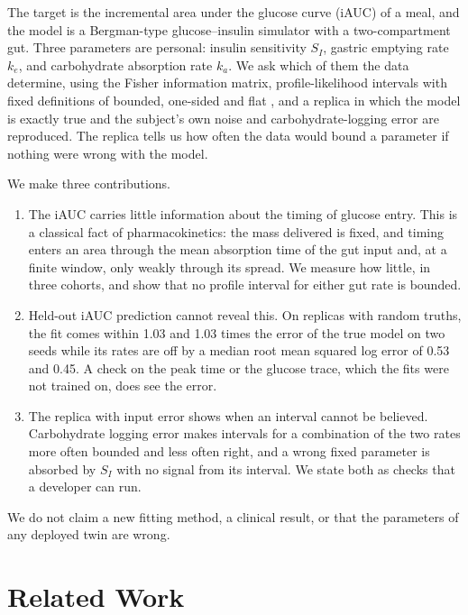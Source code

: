 \documentclass[letterpaper]{article} %
\newcommand{\resPvpRandomOneRatio}{1.03}
\newcommand{\resPvpRandomOneTiming}{0.45}
\newcommand{\resPvpRandomZeroRatio}{1.03}
\newcommand{\resPvpRandomZeroTiming}{0.53}
\begin{document}
The target is the incremental area under the glucose curve (iAUC) of a meal, and the model is a Bergman-type glucose--insulin simulator \citep{bergman1979,dallaman2007} with a two-compartment gut. Three parameters are personal: insulin sensitivity $S_I$, gastric emptying rate $k_e$, and carbohydrate absorption rate $k_a$. We ask which of them the data determine, using the Fisher information matrix, profile-likelihood intervals with fixed definitions of bounded, one-sided and flat \citep{raue2009structural}, and a replica in which the model is exactly true and the subject's own noise and carbohydrate-logging error are reproduced. The replica tells us how often the data would bound a parameter if nothing were wrong with the model.

We make three contributions.
\begin{enumerate}
\item The iAUC carries little information about the timing of glucose entry. This is a classical fact of pharmacokinetics: the mass delivered is fixed, and timing enters an area through the mean absorption time of the gut input \citep{yamaoka1978statistical,cutler1978theory} and, at a finite window, only weakly through its spread. We measure how little, in three cohorts, and show that no profile interval for either gut rate is bounded.
\item Held-out iAUC prediction cannot reveal this. On replicas with random truths, the fit comes within \resPvpRandomZeroRatio{} and \resPvpRandomOneRatio{} times the error of the true model on two seeds while its rates are off by a median root mean squared log error of \resPvpRandomZeroTiming{} and \resPvpRandomOneTiming{}. A check on the peak time or the glucose trace, which the fits were not trained on, does see the error.
\item The replica with input error shows when an interval cannot be believed. Carbohydrate logging error makes intervals for a combination of the two rates more often bounded and less often right, and a wrong fixed parameter is absorbed by $S_I$ with no signal from its interval. We state both as checks that a developer can run.
\end{enumerate}
We do not claim a new fitting method, a clinical result, or that the parameters of any deployed twin are wrong.

\section{Related Work}
\end{document}
